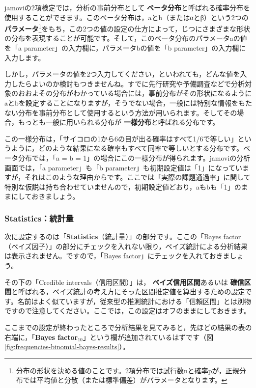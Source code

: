\documentclass[
  12pt,
  a5jpaper,
  lualatex, ja=standard]{bxjsbook}
\renewcommand{\emph}[1]{\textbf{\color{emph} #1}}
\begin{document}
jamoviの2項検定では，分析の事前分布として\emph{ベータ分布}と呼ばれる確率分布を使用することができます。このベータ分布は，aとb（またはαとβ）という2つの\emph{パラメータ}\footnote{分布の形状を決める値のことです。2項分布では試行数nと確率pが，正規分布では平均値と分散（または標準偏差）がパラメータとなります。}をもち，この2つの値の設定の仕方によって，じつにさまざまな形状の分布を表現することが可能です。そして，このベータ分布のパラメータaの値を「a parameter」の入力欄に，パラメータbの値を「b parameter」の入力欄に入力します。

しかし，パラメータの値を2つ入力してください，といわれても，どんな値を入力したらよいのか検討もつきませんね。すでに先行研究や予備調査などで分析対象のおおよその分布がわかっている場合には，事前分布がその形状になるようにaとbを設定することになりますが，そうでない場合，一般には特別な情報をもたない分布を事前分布として使用するという方法が用いられます。そしてその場合，もっとも一般に用いられる分布が\emph{一様分布}と呼ばれる分布です。

この一様分布は，「サイコロの1から6の目が出る確率はすべて1/6で等しい」というように，どのような結果になる確率もすべて同率で等しいとする分布です。ベータ分布では，「a = b = 1」の場合にこの一様分布が得られます。jamoviの分析画面では，「a parameter」も「b parameter」も初期設定値は「1」になっていますが，それはこのような理由からです。ここでは「実際の課題通過率」に関して特別な仮説は持ち合わせていませんので，初期設定値どおり，aもbも「1」のままにしておきましょう。

\hypertarget{subsub:frequencies-binomial-bayes-statistics}{%
\subsubsection*{Statistics：統計量}\label{subsub:frequencies-binomial-bayes-statistics}}

次に設定するのは「\textbf{Statistics}（統計量）」の部分です。ここの「Bayes factor（ベイズ因子）」の部分にチェックを入れない限り，ベイズ統計による分析結果は表示されません。ですので，「Bayes factor」にチェックを入れておきましょう。

その下の「Credible intervals（信用区間）」は，\emph{ベイズ信用区間}あるいは\emph{確信区間}と呼ばれる，ベイズ統計の考え方にそった区間推定値を算出するための設定です。名前はよく似ていますが，従来型の推測統計における「信頼区間」とは別物ですので注意してください。ここでは，この設定はオフのままにしておきます。

ここまでの設定が終わったところで分析結果を見てみると，先ほどの結果の表の右端に，「\textbf{Bayes factor\(_{10}\)}」という欄が追加されているはずです（図\ref{fig:frequencies-binomial-bayes-results}）。
\end{document}
